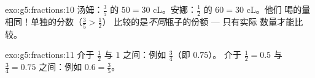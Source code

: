 \begin{solution}{exo:g5:fractions:10}
汤姆：$\frac35$ 的 $50 = 30$ cL。安娜：$\frac12$ 的 $60 = 30$ cL。他们
喝的量相同！单独的分数（$\frac35 > \frac12$）
比较的是\emph{不同}瓶子的份额 --- 只有实际
数量才能比较。
\end{solution}

\begin{solution}{exo:g5:fractions:11}
介于 $\frac12$ 与 $1$ 之间：例如 $\frac34$（即 $0.75$）。
介于 $\frac12 = 0.5$ 与 $\frac34 = 0.75$ 之间：例如 $0.6 =
\frac35$。
\end{solution}
